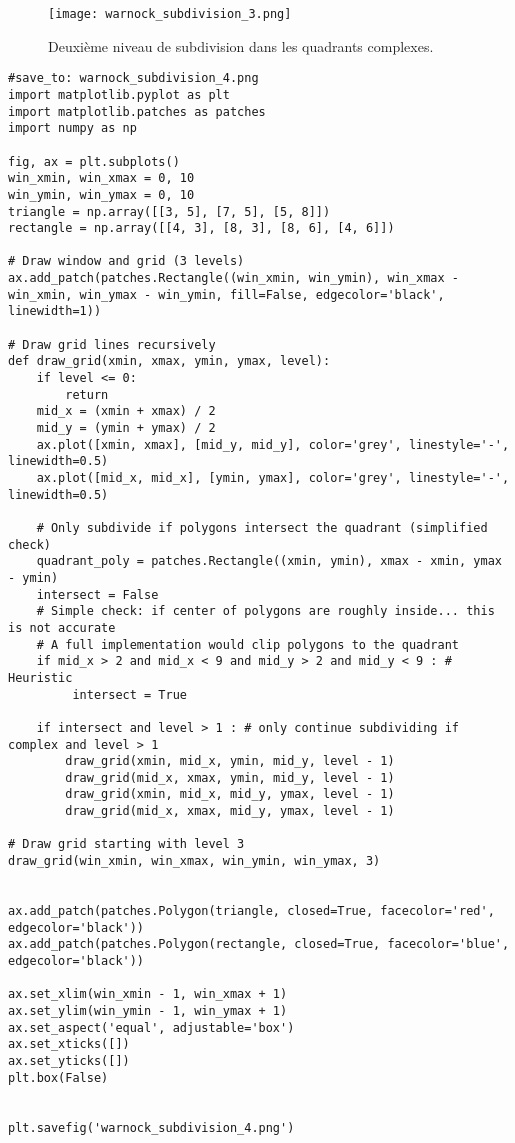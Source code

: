 \documentclass{article}
\begin{document}
\begin{figure}[H]
\centering
\texttt{[image: warnock\_subdivision\_3.png]}
\caption{Deuxième niveau de subdivision dans les quadrants complexes.}
\label{fig:warnock_subdiv_3}
\end{figure}

\begin{verbatim}
#save_to: warnock_subdivision_4.png
import matplotlib.pyplot as plt
import matplotlib.patches as patches
import numpy as np

fig, ax = plt.subplots()
win_xmin, win_xmax = 0, 10
win_ymin, win_ymax = 0, 10
triangle = np.array([[3, 5], [7, 5], [5, 8]])
rectangle = np.array([[4, 3], [8, 3], [8, 6], [4, 6]])

# Draw window and grid (3 levels)
ax.add_patch(patches.Rectangle((win_xmin, win_ymin), win_xmax - win_xmin, win_ymax - win_ymin, fill=False, edgecolor='black', linewidth=1))

# Draw grid lines recursively
def draw_grid(xmin, xmax, ymin, ymax, level):
    if level <= 0:
        return
    mid_x = (xmin + xmax) / 2
    mid_y = (ymin + ymax) / 2
    ax.plot([xmin, xmax], [mid_y, mid_y], color='grey', linestyle='-', linewidth=0.5)
    ax.plot([mid_x, mid_x], [ymin, ymax], color='grey', linestyle='-', linewidth=0.5)

    # Only subdivide if polygons intersect the quadrant (simplified check)
    quadrant_poly = patches.Rectangle((xmin, ymin), xmax - xmin, ymax - ymin)
    intersect = False
    # Simple check: if center of polygons are roughly inside... this is not accurate
    # A full implementation would clip polygons to the quadrant
    if mid_x > 2 and mid_x < 9 and mid_y > 2 and mid_y < 9 : # Heuristic
         intersect = True

    if intersect and level > 1 : # only continue subdividing if complex and level > 1
        draw_grid(xmin, mid_x, ymin, mid_y, level - 1)
        draw_grid(mid_x, xmax, ymin, mid_y, level - 1)
        draw_grid(xmin, mid_x, mid_y, ymax, level - 1)
        draw_grid(mid_x, xmax, mid_y, ymax, level - 1)

# Draw grid starting with level 3
draw_grid(win_xmin, win_xmax, win_ymin, win_ymax, 3)


ax.add_patch(patches.Polygon(triangle, closed=True, facecolor='red', edgecolor='black'))
ax.add_patch(patches.Polygon(rectangle, closed=True, facecolor='blue', edgecolor='black'))

ax.set_xlim(win_xmin - 1, win_xmax + 1)
ax.set_ylim(win_ymin - 1, win_ymax + 1)
ax.set_aspect('equal', adjustable='box')
ax.set_xticks([])
ax.set_yticks([])
plt.box(False)


plt.savefig('warnock_subdivision_4.png')
\end{verbatim}
\end{document}
